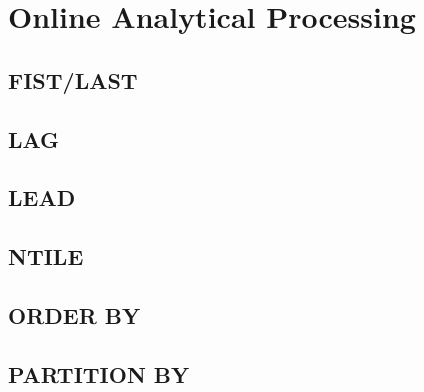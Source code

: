 \section[OLAP]{Online Analytical Processing}
\label{sec:olap}

\subsection{FIST/LAST}
\label{sec:olap.first_last}

\subsection{LAG}
\label{sec:olap.lag}

\subsection{LEAD}
\label{sec:olap.lead}

\subsection{NTILE}
\label{sec:olap.ntile}

\subsection{ORDER BY}
\label{sec:olap.order_by}

\subsection{PARTITION BY}
\label{sec:olap.partition_by}


